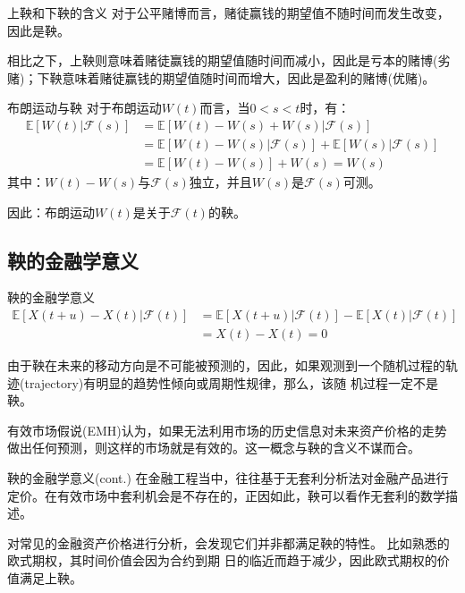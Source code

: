 \documentclass[t]{beamer}
\newcommand{\E}{\mathbb{E}}
\begin{document}
      \begin{frame}{上鞅和下鞅的含义}
      对于公平赌博而言，赌徒赢钱的期望值不随时间而发生改变，因此是鞅。
      
      相比之下，上鞅则意味着赌徒赢钱的期望值随时间而减小，因此是亏本的赌博(劣赌)；下鞅意味着赌徒赢钱的期望值随时间而增大，因此是盈利的赌博(优赌)。
      
      
      \end{frame}
      
      \begin{frame}{布朗运动与鞅}
      对于布朗运动$W(t)$而言，当$0<s<t$时，有：
      \[\begin{split}
      \E[W(t)|\mathcal{F}(s)]&=\E[W(t)-W(s)+W(s)|\mathcal{F}(s)]\\
      &=\E[W(t)-W(s)|\mathcal{F}(s)]+\E[W(s)|\mathcal{F}(s)]\\
      &=\E[W(t)-W(s)]+W(s)=W(s)
      \end{split} \]
      其中：$W(t)-W(s)$与$\mathcal{F}(s)$独立，并且$W(s)$是$\mathcal{F}(s)$可测。
      
      因此：{\color{red}布朗运动$W(t)$是关于$\mathcal{F}(t)$的鞅。}
      \end{frame}
      
      
      \subsection{鞅的金融学意义}
      \begin{frame}{鞅的金融学意义}
      \[\begin{split}
      \E[X(t+u)-X(t)|\mathcal{F}(t)]&=\E[X(t+u)|\mathcal{F}(t)]-\E[X(t)|\mathcal{F}(t)]\\
      &=X(t)-X(t)=0
      \end{split} \]
      
      由于鞅在未来的移动方向是不可能被预测的，因此，如果观测到一个随机过程的轨
      迹(trajectory)有明显的趋势性倾向或周期性规律，那么，该随
      机过程一定不是鞅。
      
      有效市场假说(EMH)认为，如果无法利用市场的历史信息对未来资产价格的走势做出任何预测，则这样的市场就是有效的。这一概念与鞅的含义不谋而合。
      \end{frame}
      
      \begin{frame}{鞅的金融学意义(cont.)}
      在金融工程当中，往往基于无套利分析法对金融产品进行定价。在有效市场中套利机会是不存在的，正因如此，{\color{red}鞅可以看作无套利的数学描述}。
      
      对常见的金融资产价格进行分析，会发现它们并非都满足鞅的特性。
      比如熟悉的欧式期权，其时间价值会因为合约到期
      日的临近而趋于减少，因此欧式期权的价值满足上鞅。
      \end{frame}
\end{document}

